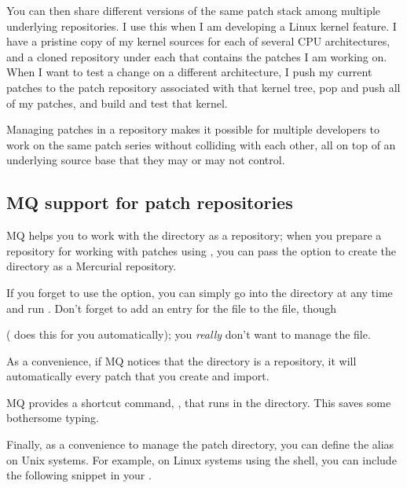 You can then share different versions of the same patch stack among
multiple underlying repositories.  I use this when I am developing a
Linux kernel feature.  I have a pristine copy of my kernel sources for
each of several CPU architectures, and a cloned repository under each
that contains the patches I am working on.  When I want to test a
change on a different architecture, I push my current patches to the
patch repository associated with that kernel tree, pop and push all of
my patches, and build and test that kernel.

Managing patches in a repository makes it possible for multiple
developers to work on the same patch series without colliding with
each other, all on top of an underlying source base that they may or
may not control.

\subsection{MQ support for patch repositories}

MQ helps you to work with the  directory as a
repository; when you prepare a repository for working with patches
using , you can pass the  option to
create the  directory as a Mercurial repository.

\begin{note}
  If you forget to use the  option, you can simply go
  into the  directory at any time and run
  .  Don't forget to add an entry for the
   file to the  file, though

  ( does this for you
  automatically); you \emph{really} don't want to manage the
   file.
\end{note}

As a convenience, if MQ notices that the 
directory is a repository, it will automatically  every
patch that you create and import.

MQ provides a shortcut command, , that runs
 in the  directory.  This saves
some bothersome typing.

Finally, as a convenience to manage the patch directory, you can
define the alias  on Unix systems. For example, on Linux
systems using the  shell, you can include the following
snippet in your .

